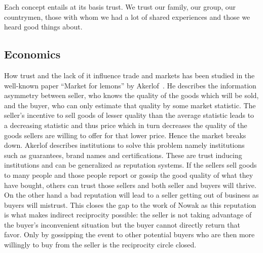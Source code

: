 Each concept entails at its basis trust. We trust our family, our group, our countrymen, those with whom we had a lot
of shared experiences and those we heard good things about. 

\subsection{Economics}
How trust and the lack of it influence trade and markets has been studied in the well-known paper ``Market for lemons'' by 
Akerlof~\cite{akerlof1970lemons}. He describes the information asymmetry between seller, who knows
the quality of the goods which will be sold, and the buyer, who can only estimate that quality by 
some market statistic. The seller's incentive to sell goods of lesser quality than the average 
statistic leads to a decreasing statistic and thus price which in turn decreases the quality of the 
goods sellers are willing to offer for that lower price. Hence the market breaks down. Akerlof
describes institutions to solve this problem namely institutions such as guarantees, brand names and
certifications. These are trust inducing institutions and can be generalized as reputation systems.
If the sellers sell goods to many people and those people report or gossip the good quality of what
they have bought, others can trust those sellers and both seller and buyers will thrive. On the 
other hand a bad reputation will lead to a seller getting out of business as buyers will mistrust.
This closes the gap to the work of Nowak as this reputation is what makes indirect reciprocity
possible: the seller is not taking advantage of the buyer's inconvenient situation but the buyer
cannot directly return that favor. Only by gossipping the event to other potential buyers who are 
then more willingly to buy from the seller is the reciprocity circle closed.~\cite{nowak2006five}

